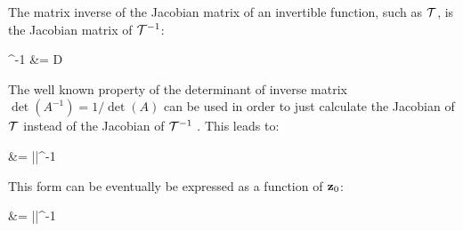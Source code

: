 The matrix inverse of the Jacobian matrix of an invertible function, such as $\mathcal{T}$,
is the Jacobian matrix of $\mathcal{T}^{-1}$: \cite{inverse-function-theorem}
    
\begin{nalign}
\left[D\tr(\z{1})\right]^{-1} &= D
\end{nalign}

The well known property of the determinant of inverse matrix $\det(A^{-1})= 1/\det(A)$
can be used in order to just calculate the Jacobian of $\mathcal{T}$ instead of the Jacobian of $\mathcal{T}^{-1}$
. This leads to:

\begin{nalign}
 &= \cdot ||^{-1}
\end{nalign}

This form can be eventually be expressed as a function of $\mathbf{z}_{0}$:

\begin{nalign}
 &= \cdot ||^{-1}
\end{nalign}
